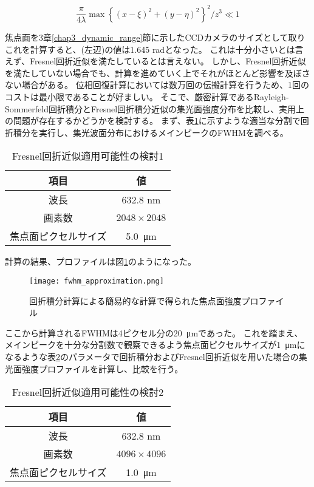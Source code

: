 \begin{equation}
\label{eqn:fresnel_approximation_condition}
    \frac{\pi}{4\lambda} \max \left\{ (x-\xi)^2 + (y-\eta)^2 \right\}^2 / z^3 \ll 1
\end{equation}

焦点面を3章\ref{chap3_dynamic_range}節に示したCCDカメラのサイズとして取りこれを計算すると、(左辺)の値は1.645 radとなった。
これは十分小さいとは言えず、Fresnel回折近似を満たしているとは言えない。
しかし、Fresnel回折近似を満たしていない場合でも、計算を進めていく上でそれがほとんど影響を及ぼさない場合がある。
位相回復計算においては数万回の伝搬計算を行うため、1回のコストは最小限であることが好ましい。
そこで、厳密計算であるRayleigh-Sommerfeld回折積分とFresnel回折積分近似の集光面強度分布を比較し、実用上の問題が存在するかどうかを検討する。
まず、表\ref{tb:check_approximation_validity_1}に示すような適当な分割で回折積分を実行し、集光波面分布におけるメインピークのFWHMを調べる。

\begin{table}[!ht]
\begin{center}
  \begin{tabular}{|c|c|} \hline
    項目 & 値 \\ \hline
    波長 & 632.8 nm \\
    画素数 & $2048 \times 2048$ \\
    焦点面ピクセルサイズ & \SI{5.0}{\micro \metre} \\ \hline
  \end{tabular}
  \caption{Fresnel回折近似適用可能性の検討1}
  \label{tb:check_approximation_validity_1}
\end{center}
\end{table}

計算の結果、プロファイルは図\ref{fig:fwhm_approximation}のようになった。

\begin{figure}[ht]
\centering
\texttt{[image: fwhm\_approximation.png]}
\caption{回折積分計算による簡易的な計算で得られた焦点面強度プロファイル}
\label{fig:fwhm_approximation}
\end{figure}

ここから計算されるFWHMは4ピクセル分の\SI{20}{\micro \metre}であった。
これを踏まえ、メインピークを十分な分割数で観察できるよう焦点面ピクセルサイズが\SI{1}{\micro \metre}になるような表\ref{tb:check_approximation_validity_2}のパラメータで回折積分およびFresnel回折近似を用いた場合の集光面強度プロファイルを計算し、比較を行う。

\begin{table}[!ht]
\begin{center}
  \begin{tabular}{|c|c|} \hline
    項目 & 値 \\ \hline
    波長 & 632.8 nm \\
    画素数 & $4096 \times 4096$ \\
    焦点面ピクセルサイズ & \SI{1.0}{\micro \metre} \\ \hline
  \end{tabular}
  \caption{Fresnel回折近似適用可能性の検討2}
  \label{tb:check_approximation_validity_2}
\end{center}
\end{table}

